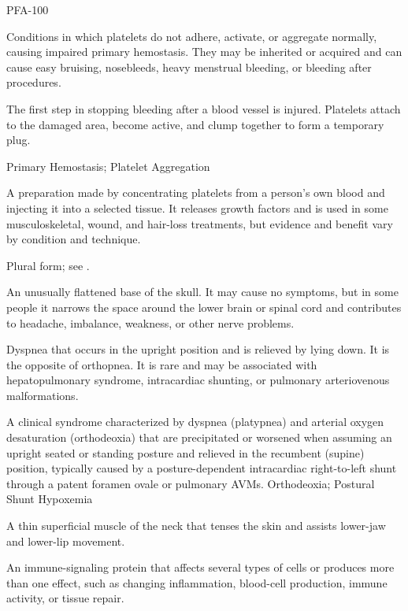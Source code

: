 \synonyms
PFA-100

 Conditions in which platelets do not adhere, activate, or aggregate normally, causing impaired primary
hemostasis. They may be inherited or acquired and can cause easy bruising, nosebleeds,
heavy menstrual bleeding, or bleeding after procedures.

 The first step in stopping bleeding after a blood vessel is injured. Platelets attach to the damaged area, become active, and clump together to form a temporary plug.

\synonyms
Primary Hemostasis; Platelet Aggregation

 A preparation made by concentrating platelets from a person's own blood and injecting it into a selected tissue. It releases growth factors and is used in some musculoskeletal, wound, and hair-loss treatments, but evidence and benefit vary by condition and technique.

 Plural form; see .

 An unusually flattened base of the skull. It may cause no symptoms, but in some people it narrows the space around the lower brain or spinal cord and contributes to headache, imbalance, weakness, or other nerve problems.

 Dyspnea that occurs in the upright position and is relieved by lying down. It is the
opposite of orthopnea. It is rare and may be associated with hepatopulmonary syndrome,
intracardiac shunting, or pulmonary arteriovenous malformations.

 A clinical syndrome characterized by dyspnea (platypnea) and arterial oxygen desaturation (orthodeoxia) that are precipitated or worsened when assuming an upright seated or standing posture and relieved in the recumbent (supine) position, typically caused by a posture-dependent intracardiac right-to-left shunt through a patent foramen ovale or pulmonary AVMs.
\synonyms
Orthodeoxia; Postural Shunt Hypoxemia

 A thin superficial muscle of the neck that tenses the skin and assists lower-jaw and lower-lip movement.

 An immune-signaling protein that affects several types of cells or produces more than one effect, such as changing inflammation, blood-cell production, immune activity, or tissue repair.

